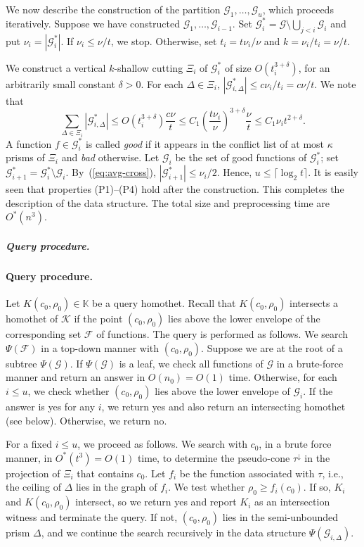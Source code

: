 \documentclass[11pt]{article}
\def\Kspace{{\mathbb K}}
\def\F{\mathcal{F}}
\def\G{\mathcal{G}}
\def\K{\mathcal{K}}
\def\cell{\tau}
\def\ceil#1{\lceil #1\rceil}
\theoremstyle{definition}
\begin{document}
We now describe the construction of the partition $\G_1, \ldots, \G_u$, which proceeds
iteratively. Suppose we have constructed $\G_1, \ldots, \G_{i-1}$. Set 
$\G_i^* = \G \setminus \bigcup_{j < i} \G_i$ and put $\nu_i = |\G_i^*|$. 
If $\nu_i \le \nu/t$, we stop. Otherwise, set $t_i = t\nu_i/\nu$ and $k=\nu_i/t_i=\nu/t$.

We construct a vertical $k$-shallow cutting $\Xi_i$ of $\G_i^*$ of size $O(t_i^{3+\delta})$,
for an arbitrarily small constant $\delta>0$. 
For each $\Delta\in \Xi_i$, $|\G_{i,\Delta}^*| \le c\nu_i/t_i = c\nu/t$. We note that
\begin{equation}
\label{eq:avg-cross}
\sum_{\Delta\in\Xi_i} |\G_{i,\Delta}^*| \le O(t_i^{3+\delta}) \frac{c\nu}{t} 
\le C_1 \left ( \frac{t\nu_i}{\nu}\right)^{3+\delta} \frac{\nu}{t} 
\le C_1 \nu_i t^{2+\delta} .
\end{equation}
A function $f \in \G_i^*$ is called \emph{good} if it appears in the conflict list of at 
most $\kappa$ prisms of $\Xi_i$ and \emph{bad} otherwise. 
Let $\G_i$ be the set of good functions of $\G_i^*$; set $\G_{i+1}^* = \G_i^*\setminus \G_i$.
By~(\ref{eq:avg-cross}), $|\G_{i+1}^*| \le \nu_i/2$. Hence, $u \le \ceil{\log_2 t}$. 
It is easily seen that properties (P1)--(P4) hold after the construction.
This completes the description of the data structure. The total size and preprocessing time are $O^*(n^3)$.


\ifsocgproc 
\subparagraph*{Query procedure.}
\else
\paragraph{Query procedure.}
\fi
Let $K(c_0,\rho_0)\in\Kspace$ be a query homothet.
Recall that $K(c_0,\rho_0)$ intersects a homothet of $\K$ if the point $(c_0,\rho_0)$ lies above the 
lower envelope of the corresponding set $\F$ of functions. The query is performed as follows. 
We search $\Psi(\F)$ in a top-down manner with $(c_0,\rho_0)$. Suppose we are at the root of a subtree
$\Psi(\G)$. If $\Psi(\G)$ is a leaf, we check all functions of $\G$ in a brute-force manner and 
return an answer in $O(n_0)=O(1)$ time. Otherwise, for each $i \le u$, we check whether $(c_0,\rho_0)$ 
lies above the lower envelope of $\G_i$. If the answer is yes for any $i$, 
we return yes and also return an intersecting homothet (see below).  Otherwise, we return no.

For a fixed $i\le u$, we proceed as follows.
We search with $c_0$, in a brute force manner, in $O^*(t^3) = O(1)$ time, 
to determine the pseudo-cone $\cell^\downarrow$ in  the projection of $\Xi_i$
that contains $c_0$. Let $f_i$ be the  function associated with $\cell$, i.e., 
the ceiling of $\Delta$ lies in the graph of $f_i$.
We test whether $\rho_0 \ge f_i(c_0)$. If so, $K_i$ and $K(c_0,\rho_0)$ intersect, so we
return yes and report $K_i$ as an intersection witness and terminate the query. If not, $(c_0,\rho_0)$
lies in the semi-unbounded prism $\Delta$,
and we continue the search recursively in the data structure $\Psi(\G_{i,\Delta})$.
\end{document}
